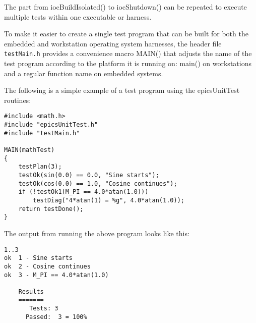 The part from iocBuildIsolated() to iocShutdown() can be repeated to execute multiple tests within one executable or harness.

To make it easier to create a single test program that can be built for both the embedded and workstation operating system harnesses, the header file \verb|testMain.h| provides a convenience macro MAIN() that adjusts the name of the test program according to the platform it is running on: main() on workstations and a regular function name on embedded systems.

The following is a simple example of a test program using the epicsUnitTest routines:

\begin{verbatim}
#include <math.h>
#include "epicsUnitTest.h"
#include "testMain.h"

MAIN(mathTest)
{
    testPlan(3);
    testOk(sin(0.0) == 0.0, "Sine starts");
    testOk(cos(0.0) == 1.0, "Cosine continues");
    if (!testOk1(M_PI == 4.0*atan(1.0)))
        testDiag("4*atan(1) = %g", 4.0*atan(1.0));
    return testDone();
}
\end{verbatim}

The output from running the above program looks like this:

\begin{verbatim}
1..3
ok  1 - Sine starts
ok  2 - Cosine continues
ok  3 - M_PI == 4.0*atan(1.0)

    Results
    =======
       Tests: 3
      Passed:  3 = 100%

\end{verbatim}
